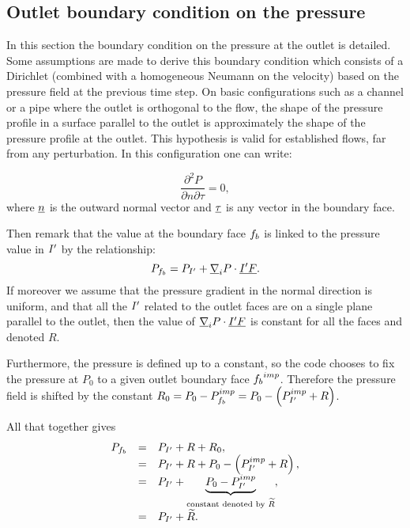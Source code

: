 \subsection{Outlet boundary condition on the pressure}\label{sec:bndcnd:outlet_pressure}

In this section the boundary condition on the pressure at the outlet is detailed. Some
assumptions are made to derive this boundary condition which consists of a Dirichlet
(combined with a homogeneous Neumann on the velocity) based on the pressure field
at the previous time step.
On basic configurations such as a channel or a pipe where the outlet is orthogonal
to the flow, the shape of the pressure profile in a surface parallel to the outlet is
approximately the shape of the pressure profile at the outlet. This hypothesis
is valid for established flows, far from any perturbation. In this configuration
one can write:

\begin{equation*}
\displaystyle\frac{\partial^2 P}{\partial n \partial \tau } = 0,
\end{equation*}
where $\underline{n}$ is the outward normal vector and  $\underline{\tau}$ is any
vector in the boundary face.

Then remark that the value at the boundary face ${f_{b}}$ is linked
to the pressure value in ${I^\prime}$ by the relationship:
\begin{equation*}
P_{f_{b}} = P_{{I^\prime}} +  \underline{\nabla}_i P \cdot \underline{{I^\prime}F}.
\end{equation*}
If moreover we assume that the pressure gradient in the normal direction
is uniform, and that all the ${I^\prime}$ related to the outlet faces are on
a single plane parallel to the outlet, then the value of $ \underline{\nabla}_i P \cdot \underline{{I^\prime}F} $
is constant for all the faces and denoted $R$.

Furthermore, the pressure is defined up to a constant, so the code
chooses to fix the pressure at $P_0$ to a given outlet boundary face
${f_{b}}^{imp}$. Therefore the pressure field is shifted  by the constant
$R_0=P_0- P_{f_{b}}^{imp} = P_0 - \left( P_{{I^\prime}}^{imp}+R \right)$.

All that together gives
\begin{equation}
\begin{array}{rcl}
P_{f_{b}}
   &=& P_{{I^\prime}}+R+R_0,\\
   &=& P_{{I^\prime}}+R+P_0- \left( P_{{I^\prime}}^{imp}+R \right),\\
   &=&P_{{I^\prime}} +\underbrace{P_0-P_{{I^\prime}}^{imp}}_{\text{constant denoted by $\widetilde{R}$}} ,\\
   &=&P_{{I^\prime}} + \widetilde{R}.
\end{array}
\end{equation}

